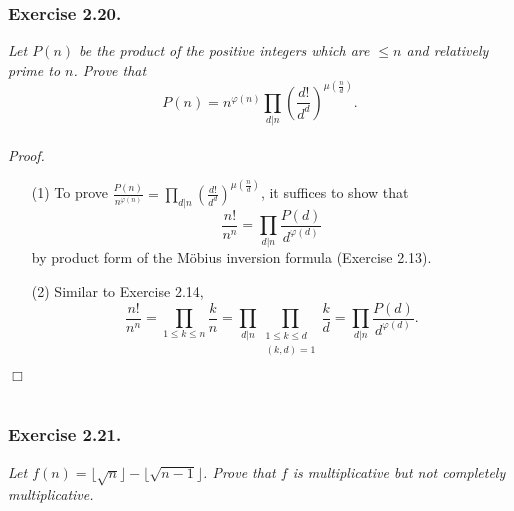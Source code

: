 \documentclass{article}
\begin{document}
\subsubsection*{Exercise 2.20.}
\emph{Let $P(n)$ be the product of the positive integers which are $\leq n$ and
relatively prime to $n$.
Prove that
\[
  P(n)
  = n^{\varphi(n)} \prod_{d|n} \left( \frac{d!}{d^d} \right)^{\mu\left( \frac{n}{d} \right)}.
\]} \\



\emph{Proof.}
\begin{enumerate}
\item[(1)]
  To prove $\frac{P(n)}{n^{\varphi(n)}}
  = \prod_{d|n} \left( \frac{d!}{d^d} \right)^{\mu\left( \frac{n}{d} \right)}$,
  it suffices to show that
  \[
    \frac{n!}{n^n} = \prod_{d|n} \frac{P(d)}{d^{\varphi(d)}}
  \]
  by product form of the M\"obius inversion formula (Exercise 2.13).

\item[(2)]
  Similar to Exercise 2.14,
  \[
    \frac{n!}{n^n}
    = \prod_{1 \leq k \leq n} \frac{k}{n}
    = \prod_{d|n} \prod_{\substack{1 \leq k \leq d \\ (k,d) = 1}} \frac{k}{d}
    = \prod_{d|n} \frac{P(d)}{d^{\varphi(d)}}.
  \]
\end{enumerate}
$\Box$ \\\\






\subsubsection*{Exercise 2.21.}
\emph{Let $f(n) = \lfloor \sqrt{n} \rfloor - \lfloor \sqrt{n-1} \rfloor$.
Prove that $f$ is multiplicative but not completely multiplicative.} \\
\end{document}
